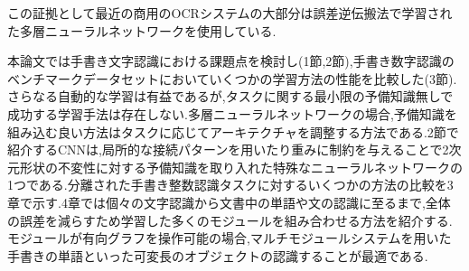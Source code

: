 \documentclass[twocolumn]{jarticle}     %
\begin{document}
この証拠として最近の商用のOCRシステムの大部分は誤差逆伝搬法で学習された多層ニューラルネットワークを使用している.\par
本論文では手書き文字認識における課題点を検討し(1節,2節),手書き数字認識のベンチマークデータセットにおいていくつかの学習方法の性能を比較した(3節).さらなる自動的な学習は有益であるが,タスクに関する最小限の予備知識無しで成功する学習手法は存在しない.多層ニューラルネットワークの場合,予備知識を組み込む良い方法はタスクに応じてアーキテクチャを調整する方法である.2節で紹介するCNN\cite{2}は,局所的な接続パターンを用いたり重みに制約を与えることで2次元形状の不変性に対する予備知識を取り入れた特殊なニューラルネットワークの1つである.分離された手書き整数認識タスクに対するいくつかの方法の比較を3章で示す.4章では個々の文字認識から文書中の単語や文の認識に至るまで,全体の誤差を減らすため学習した多くのモジュールを組み合わせる方法を紹介する.モジュールが有向グラフを操作可能の場合,マルチモジュールシステムを用いた手書きの単語といった可変長のオブジェクトの認識することが最適である.





\end{document}
